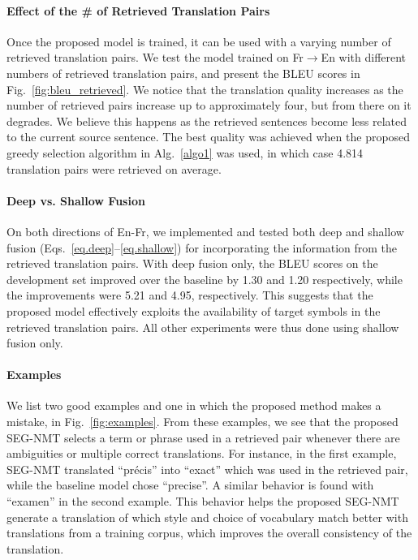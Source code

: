 \vspace{-7pt}
\paragraph{Effect of the \# of Retrieved Translation Pairs}
Once the proposed model is trained, it can be used with a varying number of retrieved translation pairs. We test the model trained on Fr$\to$En with different numbers of retrieved translation pairs, and present the BLEU scores in Fig.~\ref{fig:bleu_retrieved}. We notice that the translation quality increases as the number of retrieved pairs increase up to approximately four, but from there on it degrades. We believe this happens as the retrieved sentences become less related to the current source sentence. The best quality was achieved when the proposed greedy selection algorithm in Alg.~\ref{algo1} was used, in which case 4.814 translation pairs were retrieved on average. 

\vspace{-7pt}
\paragraph{Deep vs. Shallow Fusion}
On both directions of En-Fr, we implemented and tested both deep and shallow fusion (Eqs.~\eqref{eq.deep}--\eqref{eq.shallow}) for incorporating the information from the retrieved translation pairs. With deep fusion only, the BLEU scores on the development set improved over the baseline by 1.30 and 1.20 respectively, while the improvements were 5.21 and 4.95, respectively. This suggests that the proposed model effectively exploits the availability of target symbols in the retrieved translation pairs. All other experiments were thus done using shallow fusion only.

\vspace{-7pt}
\paragraph{Examples}
We list two good examples and one in which the proposed method makes a mistake, in Fig.~\ref{fig:examples}. From these examples, we see that the proposed SEG-NMT selects a term or phrase used in a retrieved pair whenever there are ambiguities or multiple correct translations. For instance, in the first example, SEG-NMT translated ``pr\'ecis'' into ``exact'' which was used in the retrieved pair, while the baseline model chose ``precise''. A similar behavior is found with ``examen'' in the second example. This behavior helps the proposed SEG-NMT generate a translation of which style and choice of vocabulary match better with translations from a training corpus, which improves the overall consistency of the translation.


